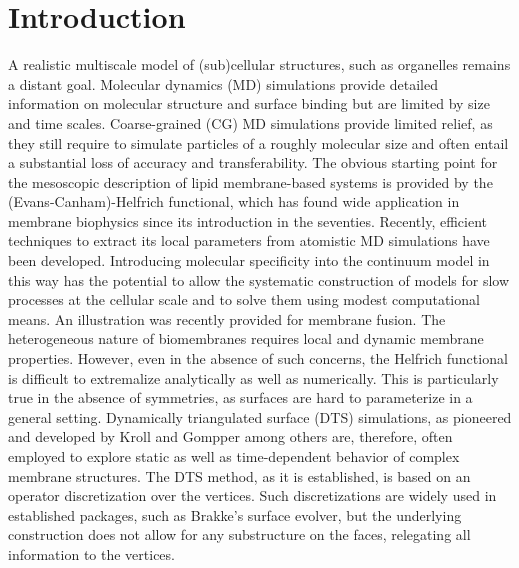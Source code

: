 \documentclass[twocolumn]{biophys-new}
\begin{document}
\section*{Introduction}
A realistic multiscale model of (sub)cellular structures, such as organelles remains a distant goal.  Molecular dynamics (MD) simulations provide detailed information on molecular structure and surface binding but are limited by size and time scales. Coarse-grained (CG) MD simulations provide limited relief, as they still require to simulate particles of a roughly molecular size and often entail a substantial loss of accuracy and transferability.\cite{doi:10.1021/acs.jpcb.2c08731} The obvious starting point for the mesoscopic description of lipid membrane-based systems is provided by the (Evans-Canham)-Helfrich functional\cite{evansh,Canham197061,Helf1973}, which has found wide application in membrane biophysics\cite{golani2019membrane,Bassereau_2018,10.7554/eLife.08828,Pezeshkian2020,doi:10.1073/pnas.1101210108} since its introduction in the seventies. Recently, efficient techniques to extract its local parameters from atomistic MD simulations have been developed.\cite{ALLOLIO201831,doi:10.1021/acsnano.0c08614,watsonbrownprl,Khelashvili20091626,desernobend} Introducing molecular specificity into the continuum model in this way has the potential to allow the systematic construction of models for slow processes at the cellular scale and to solve them using modest computational means. An illustration was recently provided for membrane fusion.\cite{doi:10.1021/acsnano.0c08614} The heterogeneous nature of biomembranes requires local and dynamic membrane properties.  
However, even in the absence of such concerns, the Helfrich functional is difficult to extremalize analytically as well as numerically. This is particularly true in the absence of symmetries, as surfaces are hard to parameterize in a general setting. Dynamically triangulated surface (DTS) simulations, as pioneered\cite{gomppkroll} and developed\cite{PhysRevLett.81.2284,Gompper_1997} by Kroll and Gompper among others\cite{julicher,kantor, meyer} are, therefore, often employed to explore static as well as time-dependent behavior of complex membrane structures.\cite{doi:10.1073/pnas.0811484106,D1SM00540E,Vutukuri2020-ok,RAMAKRISHNAN20141} The DTS method, as it is established, is based on an operator discretization over the vertices.\cite{BIAN2020112758} Such discretizations are widely used in established packages\cite{siggel2022trimem,dtmc}, such as Brakke's surface evolver\cite{doi:10.1080/10586458.1992.10504253},
 but the underlying construction does not allow for any substructure on the faces, relegating all information to the vertices.
\end{document}
